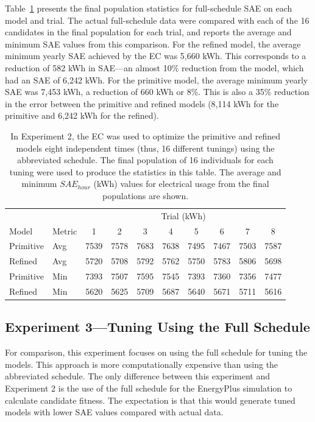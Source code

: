 \documentclass[preprint, review, 12pt]{elsarticle}
\begin{document}
Table~\ref{tab:hourly-abbrev} presents the final population statistics for full-schedule SAE on each model and trial. The actual full-schedule data were compared with each of the 16 candidates in the final population for each trial, and reports the average and minimum SAE values from this comparison. For the refined model, the average minimum yearly SAE achieved by the EC was 5,660 kWh. This corresponds to a reduction of 582 kWh in SAE---an almost 10\% reduction from the model, which had an SAE of 6,242 kWh. For the primitive model, the average minimum yearly SAE was 7,453 kWh, a reduction of 660 kWh or 8\%. This is also a 35\% reduction in the error between the primitive and refined models (8,114 kWh for the primitive and 6,242 kWh for the refined).


\begin{table}[htbp]
\centering
\caption{In Experiment 2, the EC was used to optimize the primitive and refined models eight independent times (thus, 16 different tunings) using the abbreviated schedule. The final population of 16 individuals for each tuning were used to produce the statistics in this table. The average and minimum $SAE_{hour}$ (kWh) values for electrical usage from the final populations are shown.}
\label{tab:hourly-abbrev}
\begin{tabular}{llcccccccc}
\toprule
 &  & \multicolumn{8}{c}{Trial (kWh)}\\
Model & Metric & 1 & 2 & 3 & 4 & 5 & 6 & 7 & 8\\
\midrule
Primitive & Avg & 7539 & 7578 & 7683 & 7638 & 7495 & 7467 & 7503 & 7587\\\rowcolor{DarkRow}
Refined   & Avg & 5720 & 5708 & 5792 & 5762 & 5750 & 5783 & 5806 & 5698\\
Primitive & Min & 7393 & 7507 & 7595 & 7545 & 7393 & 7360 & 7356 & 7477\\\rowcolor{DarkRow}
Refined   & Min & 5620 & 5625 & 5709 & 5687 & 5640 & 5671 & 5711 & 5616\\
\bottomrule
\end{tabular}
\end{table}


\subsection{Experiment 3---Tuning Using the Full Schedule}
\label{sub:experiment3}
For comparison, this experiment focuses on using the full schedule for tuning the models. This approach is more computationally expensive than using the abbreviated schedule. The only difference between this experiment and Experiment 2 is the use of the full schedule for the EnergyPlus simulation to calculate candidate fitness. The expectation is that this would generate tuned models with lower SAE values compared with actual data.
\end{document}
